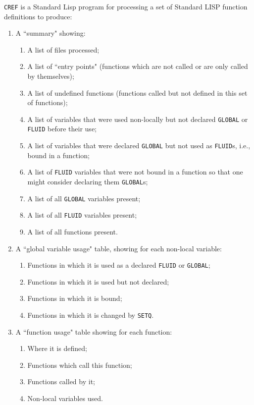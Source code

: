 {\tt CREF}  is a Standard Lisp program for processing a
set of Standard LISP function definitions to produce:
\begin{enumerate}
\item A ``summary" showing:
\begin{enumerate}
\item A list of files processed;
\item A list of ``entry points" (functions which are not called or
are only called by themselves);
\item A list of undefined functions (functions called but not
defined in this set of functions);
\item A list of variables that were used non-locally but not
declared {\tt GLOBAL} or {\tt FLUID} before their use;
\item A list of variables that were declared {\tt GLOBAL} but not used
as {\tt FLUID}s, i.e., bound in a function;
\item A list of {\tt FLUID} variables that were not bound in a function
so that one might consider declaring them {\tt GLOBAL}s;
\item A list of all {\tt GLOBAL} variables present;
\item A list of all {\tt FLUID} variables present;
\item A list of all functions present.
\end{enumerate}
\item A ``global variable usage" table, showing for each non-local
   variable:
\begin{enumerate}
\item Functions in which it is used as a declared {\tt FLUID} or {\tt GLOBAL};
\item Functions in which it is used but not declared;
\item Functions in which it is bound;
\item Functions in which it is changed by {\tt SETQ}.
\end{enumerate}
\item A ``function usage" table showing for each function:
\begin{enumerate}
\item Where it is defined;
\item Functions which call this function;
\item Functions called by it;
\item Non-local variables used.
\end{enumerate}
\end{enumerate}

